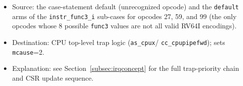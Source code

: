 \begin{itemize}
\begin{itemize}
    \item Source: the case-statement default (unrecognized opcode) and the
      \texttt{default} arms of the \texttt{instr\_func3\_i} sub-cases for
      opcodes 27, 59, and 99 (the only opcodes whose 8 possible
      \texttt{func3} values are not all valid RV64I encodings).
    \item Destination: CPU top-level trap logic (\texttt{as\_cpux}/
      \texttt{cc\_cpupipefwd}); sets \texttt{mcause}=2.
    \item Explanation: see Section~\ref{subsec:irqconcept} for the full
      trap-priority chain and CSR update sequence.
  \end{itemize}
\end{itemize}
